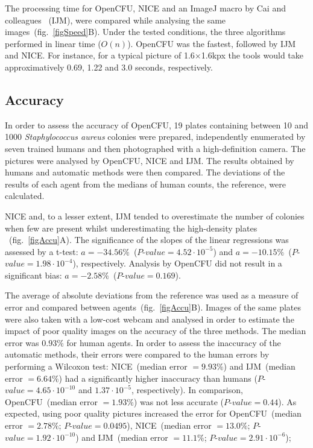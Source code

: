 \documentclass[10pt]{article}
\newcommand{\n}{seven}
\newcommand{\sa}{\emph{Staphylococcus aureus}}
\newcommand{\IJM}{IJM}
\begin{document}
The processing time for OpenCFU, NICE\cite{clarke_lowcost_2010} and an ImageJ macro by Cai and colleagues
\cite{cai_optimized_2011}~(\IJM{}),
were compared while analysing the same images~(fig.~\ref{figSpeed}B). Under the
tested conditions, the three algorithms performed in linear time ($O(n)$).
OpenCFU was the fastest, followed by \IJM{} and NICE.
For instance, for a typical picture of 1.6$\times{}$1.6kpx the tools would take
approximatively 0.69, 1.22 and 3.0 seconds, respectively.

\subsection*{Accuracy} 
In order to assess the accuracy of OpenCFU, 19 plates
containing between 10 and 1000 \sa{} colonies were prepared, independently
enumerated by \n{} trained humans and then photographed with a high-definition camera.
The pictures were analysed by OpenCFU, NICE and \IJM{}.
The results obtained by humans and automatic methods were then compared.
The deviations of the results of each
agent from the medians of human counts, the reference, were
calculated.

NICE and, to a lesser extent, \IJM{} tended to overestimate the number of
colonies when few are present
whilst underestimating the high-density
plates 
~(fig.~\ref{figAccu}A). The significance of the slopes of the linear
regressions was assessed by a t-test:
$a = -34.56\%$~($P$-$value = 4.52 \cdot 10^{-5}$) and $a = -10.15\%$~($P$-$value =
1.98  \cdot 10^{-4}$), respectively. Analysis by OpenCFU did not result
in a significant bias: $a = -2.58\%$~($P$-$value = 0.169$).

The average of absolute deviations from the reference was used
as a measure of error and compared between agents~(fig.~\ref{figAccu}B).
Images of the same plates were also taken with a low-cost webcam and analysed in
order to estimate the impact of poor quality images on the accuracy of the three
methods.
The median error was $0.93\%$ for human agents. In order to assess the
inaccuracy of the automatic methods, their errors were compared to the human
errors by performing a Wilcoxon test:
NICE~(median error $= 9.93\%$) and \IJM{}~(median error $= 6.64\%$) had a significantly higher inaccuracy than
humans ($P$-$value = 4.65\cdot 10^{-10}$ and $1.37\cdot 10^{-5}$, respectively).
In comparison, OpenCFU~(median error $= 1.93\%$) was not less accurate ($P$-$value = 0.44$).
As expected, using poor quality pictures increased the error for OpenCFU~(median error $= 2.78\%$; $P$-$value =
0.0495$), NICE~(median error $= 13.0\%$; $P$-$value = 1.92 \cdot 10^{-10}$) and \IJM{}~(median error $= 11.1\%$; $P$-$value = 2.91 \cdot 10^{-6} $);
\end{document}
